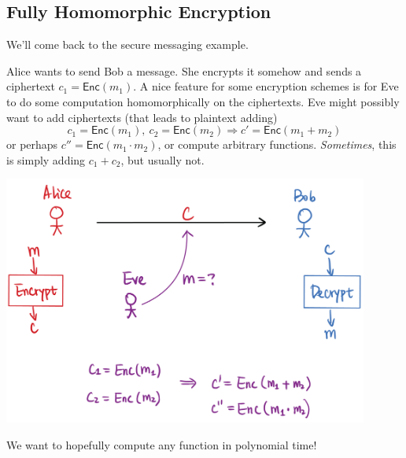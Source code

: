 \subsection{Fully Homomorphic Encryption}
We'll come back to the secure messaging example.

Alice wants to send Bob a message. She encrypts it somehow and sends a ciphertext $c_1 = \mathsf{Enc}(m_1)$. A nice feature for some encryption schemes is for Eve to do some computation homomorphically on the ciphertexts. Eve might possibly want to add ciphertexts (that leads to plaintext adding)
\[c_1 = \mathsf{Enc}(m_1),\ c_2 = \mathsf{Enc}(m_2)\Rightarrow c' = \mathsf{Enc}(m_1 + m_2)\]
or perhaps $c'' = \mathsf{Enc}(m_1\cdot m_2)$, or compute arbitrary functions. \emph{Sometimes}, this is simply adding $c_1 + c_2$, but usually not.

\begin{center}
    \includegraphics[width=0.9\textwidth]{images/2023-01-26/homomorphic_encryption.png}
\end{center}

We want to hopefully compute any function in polynomial time!


